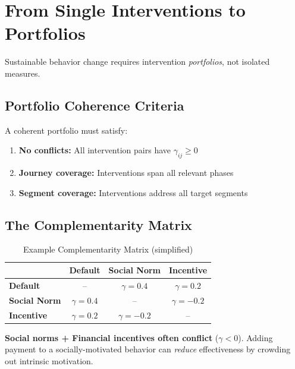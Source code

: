 \documentclass[11pt,a4paper]{article}
\begin{document}
\section{From Single Interventions to Portfolios}

Sustainable behavior change requires intervention \textit{portfolios}, not isolated measures.

\subsection{Portfolio Coherence Criteria}

A coherent portfolio must satisfy:
\begin{enumerate}[nosep]
\item \textbf{No conflicts:} All intervention pairs have $\gamma_{ij} \geq 0$
\item \textbf{Journey coverage:} Interventions span all relevant phases
\item \textbf{Segment coverage:} Interventions address all target segments
\end{enumerate}

\subsection{The Complementarity Matrix}

\begin{table}[h]
\centering
\renewcommand{\arraystretch}{1.3}
\small
\begin{tabular}{@{}lccc@{}}
\toprule
& \textbf{Default} & \textbf{Social Norm} & \textbf{Incentive} \\
\midrule
\textbf{Default} & -- & $\gamma = 0.4$ & $\gamma = 0.2$ \\
\textbf{Social Norm} & $\gamma = 0.4$ & -- & $\gamma = -0.2$ \\
\textbf{Incentive} & $\gamma = 0.2$ & $\gamma = -0.2$ & -- \\
\bottomrule
\end{tabular}
\caption{Example Complementarity Matrix (simplified)}
\end{table}

\begin{tcolorbox}[colback=warningorange!10, colframe=warningorange, title=\textbf{Warning: Crowding Out}]
\textbf{Social norms + Financial incentives often conflict} ($\gamma < 0$). Adding payment to a socially-motivated behavior can \textit{reduce} effectiveness by crowding out intrinsic motivation.
\end{tcolorbox}
\end{document}
